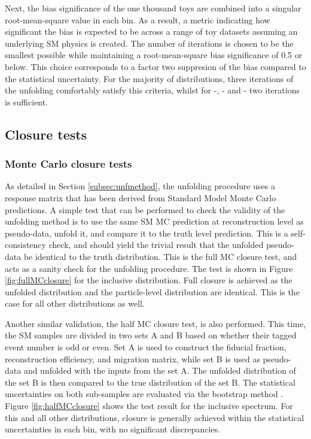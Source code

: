 Next, the bias significance of the one thousand toys are combined into a singular root-mean-square value in each bin. As a result, a metric indicating how significant the bias is expected to be across a range of toy datasets assuming an underlying SM physics is created. The number of iterations is chosen to be the smallest possible while maintaining a root-mean-square bias significance of 0.5 or below. This choice corresponds to a factor two suppresion of the bias compared to the statistical uncertainty. For the majority of distributions, three iterations of the unfolding comfortably satisfy this criteria, whilst for \mZOne-\mFourL, \dPhill-\mFourL{} and \dYPairs-\mFourL{} two iterations is sufficient. 
\subsection{Closure tests}
\label{ssec:closuretests}
\subsubsection{Monte Carlo closure tests}

As detailed in Section \ref{subsec:unfmethod}, the unfolding procedure uses a response matrix that has been derived from Standard Model Monte Carlo predictions. A simple test that can be performed to check the validity of the unfolding method is to use the same SM MC prediction at reconstruction level as pseudo-data, unfold it, and compare it to the truth level prediction. This is a self-consistency check, and should yield the trivial result that the unfolded pseudo-data be identical to the truth distribution. This is the full MC closure test, and acts as a sanity check for the unfolding procedure. The test is shown in Figure \ref{fig:fullMCclosure} for the inclusive \mFourL{} distribution. Full closure is achieved as the unfolded distribution and the particle-level distribution are identical. This is the case for all other distributions as well.

Another similar validation, the half MC closure test, is also performed. This time, the SM samples are divided in two sets A and B based on whether their tagged event number is odd or even. Set A is used to construct the fiducial fraction, reconstruction efficiency, and migration matrix, while set B is used as pseudo-data and unfolded with the inputs from the set A. The unfolded distribution of the set B is then compared to the true distribution of the set B. The statistical uncertainties on both sub-samples are evaluated via the bootstrap method \cite{ATLAS_Bootsrap_2021}. Figure \ref{fig:halfMCclosure} shows the test result for the inclusive \mFourL{} spectrum. For this and all other distributions, closure is generally achieved within the statistical uncertainties in each bin, with no significant discrepancies. 

